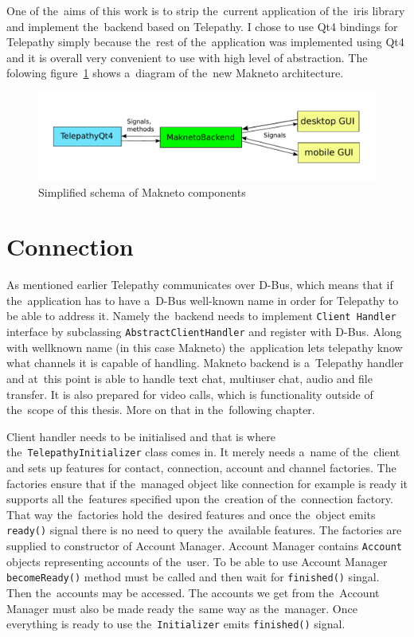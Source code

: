 One of the~aims of this work is to strip the~current application of the~iris library and implement the~backend based on Telepathy. I chose to use Qt4 bindings for Telepathy simply because the~rest of the~application was implemented using Qt4 and it is overall very convenient to use with high level of abstraction.	The folowing figure~\ref{fig:MaknetoArchitectureDiagram} shows a~diagram of the~new Makneto architecture. 

\begin{figure}[ht]
	\begin{center}
	\includegraphics[width=15cm]{fig/maknetoArchitecture}
	\caption{Simplified schema of Makneto components}
	\label{fig:MaknetoArchitectureDiagram}
\end{center}
\end{figure}

\section{Connection}
As mentioned earlier Telepathy communicates over D-Bus, which means that if the~application has to have a~D-Bus well-known name in order for Telepathy to be able to address it.	Namely the~backend needs to implement \verb|Client Handler| interface by subclassing \verb|AbstractClientHandler| and register with D-Bus. Along with wellknown name (in this case Makneto) the~application lets telepathy know what channels it is capable of handling. Makneto backend is a~Telepathy handler and at~this point is able to handle text chat, multiuser chat, audio and file transfer. It is also prepared for video calls, which is functionality outside of the~scope of this thesis. More on that in the~following chapter. 

Client handler needs to be initialised and that is where the~\verb|TelepathyInitializer| class comes in. It merely needs a~name of the~client and sets up features for contact, connection, account and channel factories. The factories ensure that if the~managed object like connection for example is ready it supports all the~features specified upon the~creation of the~connection factory. That way the~factories hold the~desired features and once the~object emits \verb|ready()| signal there is no need to query the~available features. The factories are supplied to constructor of Account Manager. Account Manager contains \verb|Account| objects representing accounts of the~user. To be able to use Account Manager \verb|becomeReady()| method must be called and then wait for \verb|finished()| singal. Then the~accounts may be accessed. The accounts we get from the~Account Manager must also be made ready the~same way as the~manager. Once everything is ready to use the~\verb|Initializer| emits \verb|finished()| signal. 

